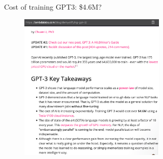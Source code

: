 \begin{vbframe}{Cost of training GPT3: \$4.6M?}

\vfill

	\begin{figure}
		\centering
		\includegraphics[width=7cm]{figure/gpt3cost.png}
	\end{figure}

\vfill

\end{vbframe}


\endlecture

